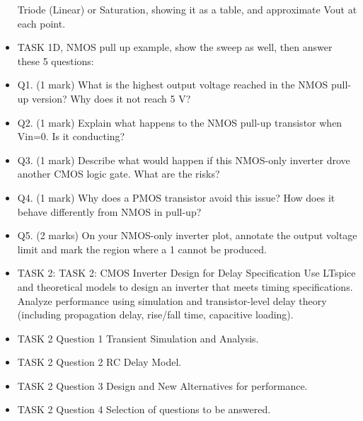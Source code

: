 \documentclass[a4paper,12pt]{article}
\begin{document}
\begin{itemize}
    Triode (Linear) or Saturation, showing it as a table, and approximate Vout at each point.
    \item TASK 1D, NMOS pull up example, show the sweep as well, then answer these 5 questions:
    \item Q1. (1 mark) What is the highest output voltage reached in the NMOS pull-up version? Why does it not reach 5 V?
    \item Q2. (1 mark) Explain what happens to the NMOS pull-up transistor when Vin=0. Is it conducting?
    \item Q3. (1 mark) Describe what would happen if this NMOS-only inverter drove another CMOS logic gate. What are the risks?
    \item Q4. (1 mark) Why does a PMOS transistor avoid this issue? How does it behave differently from NMOS in pull-up?
    \item Q5. (2 marks) On your NMOS-only inverter plot, annotate the output voltage limit and mark the region where a 1 cannot be produced.
    \item TASK 2: TASK 2: CMOS Inverter Design for Delay Specification
    Use LTspice and theoretical models to design an inverter that meets timing specifications. Analyze
    performance using simulation and transistor-level delay theory (including propagation delay, rise/fall
    time, capacitive loading).
    \item TASK 2 Question 1 Transient Simulation and Analysis.
    \item TASK 2 Question 2 RC Delay Model.
    \item TASK 2 Question 3 Design and New Alternatives for performance.
    \item TASK 2 Question 4 Selection of questions to be answered.
\end{itemize}
\end{document}
